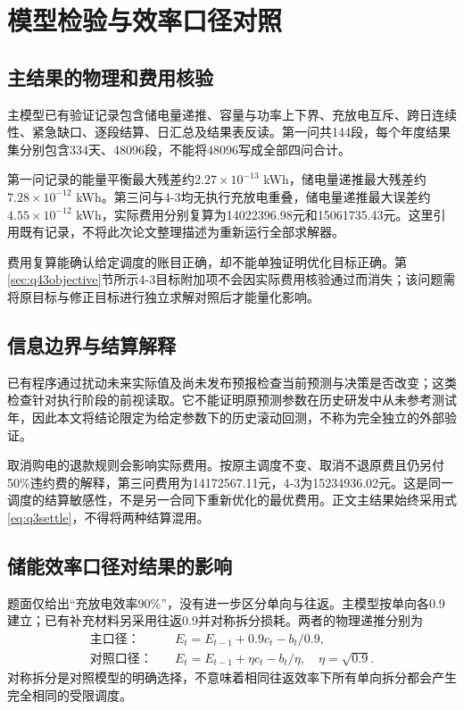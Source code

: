 \section{模型检验与效率口径对照}
\subsection{主结果的物理和费用核验}
主模型已有验证记录包含储电量递推、容量与功率上下界、充放电互斥、跨日连续性、紧急缺口、逐段结算、日汇总及结果表反读。第一问共144段，每个年度结果集分别包含334天、48096段，不能将48096写成全部四问合计。

第一问记录的能量平衡最大残差约$2.27\times10^{-13}$ kWh，储电量递推最大残差约$7.28\times10^{-12}$ kWh。第三问与4-3均无执行充放电重叠，储电量递推最大误差约$4.55\times10^{-12}$ kWh，实际费用分别复算为14022396.98元和15061735.43元。这里引用既有记录，不将此次论文整理描述为重新运行全部求解器。

费用复算能确认给定调度的账目正确，却不能单独证明优化目标正确。第\ref{sec:q43objective}节所示4-3目标附加项不会因实际费用核验通过而消失；该问题需将原目标与修正目标进行独立求解对照后才能量化影响。

\subsection{信息边界与结算解释}
已有程序通过扰动未来实际值及尚未发布预报检查当前预测与决策是否改变；这类检查针对执行阶段的前视读取。它不能证明原预测参数在历史研发中从未参考测试年，因此本文将结论限定为给定参数下的历史滚动回测，不称为完全独立的外部验证。

取消购电的退款规则会影响实际费用。按原主调度不变、取消不退原费且仍另付50\%违约费的解释，第三问费用为14172567.11元，4-3为15234936.02元。这是同一调度的结算敏感性，不是另一合同下重新优化的最优费用。正文主结果始终采用式\eqref{eq:q3settle}，不得将两种结算混用。

\subsection{储能效率口径对结果的影响}\label{sec:efficiency}
题面仅给出“充放电效率90\%”，没有进一步区分单向与往返。主模型按单向各0.9建立；已有补充材料\cite{efficiency}另采用往返0.9并对称拆分损耗。两者的物理递推分别为
\begin{align}
\text{主口径：}\quad&E_t=E_{t-1}+0.9c_t-b_t/0.9,\\
\text{对照口径：}\quad&E_t=E_{t-1}+\eta c_t-b_t/\eta,\quad\eta=\sqrt{0.9}.
\end{align}
对称拆分是对照模型的明确选择，不意味着相同往返效率下所有单向拆分都会产生完全相同的受限调度。


